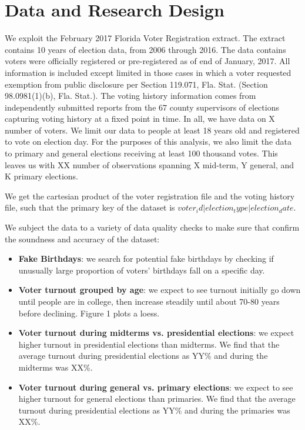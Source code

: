 \documentclass[12pt, letterpaper]{article}
\begin{document}
\section{Data and Research Design}
We exploit the February 2017 Florida Voter Registration extract. The extract contains 10 years of election data, from 2006 through 2016. The data contains voters were officially registered or pre-registered as of end of January, 2017. All information is included except limited in those cases in which a voter requested exemption from public disclosure per Section 119.071, Fla. Stat.  (Section 98.0981(1)(b), Fla. Stat.). The voting history information comes from independently submitted reports from the 67 county supervisors of elections capturing voting history at a fixed point in time. In all, we have data on X number of voters. We limit our data to people at least 18 years old and registered to vote on election day. For the purposes of this analysis, we also limit the data to primary and general elections receiving at least 100 thousand votes. This leaves us with XX number of observations spanning X mid-term, Y general, and K primary elections. 






We get the cartesian product of the voter registration file and the voting history file, such that the primary key of the dataset is $voter_id | election_type | election_date$. 

We subject the data to a variety of data quality checks to make sure that confirm the soundness and accuracy of the dataset: 

\begin{itemize}

	\item \textbf{Fake Birthdays}: we search for potential fake birthdays by checking if unusually large proportion of voters' birthdays fall on a specific day.

	\item \textbf{Voter turnout grouped by age}: we expect to see turnout initially go down until people are in college, then increase steadily until about 70-80 years before declining. Figure 1 plots a loess.  

	\item \textbf{Voter turnout during midterms vs. presidential elections}: we expect higher turnout in presidential elections than midterms. We find that the average turnout during presidential elections as YY\% and during the midterms was XX\%. 

	\item \textbf{Voter turnout during general vs. primary elections}: we expect to see higher turnout for general elections than primaries. We find that the average turnout during presidential elections as YY\% and during the primaries was XX\%. 

\end{itemize}
\end{document}
